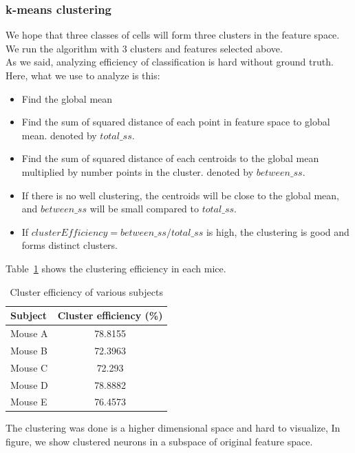 \documentclass[11pt]{article}
\begin{document}
\subsubsection{k-means clustering} %
\label{ssub:k_means_clustering}
We hope that three classes of cells will form three clusters in the feature space. We run the algorithm with 3 clusters and features selected above.\\
As we said,  analyzing efficiency of classification is hard without ground truth. Here, what we use to analyze is this:
\begin{itemize}
    \item Find the global mean
    \item Find the sum of squared distance of each point in feature space to global mean. denoted by $total\_ss$.
    \item Find the sum of squared distance of each centroids to the global mean multiplied by number points in the cluster. denoted by $between\_ss$.
    \item If there is no well clustering, the centroids will be close to the global mean, and $between\_ss$ will be small compared to $total\_ss$.
    \item If $clusterEfficiency = between\_ss/total\_ss$ is high, the clustering is good and forms distinct clusters.
\end{itemize}
Table~\ref{tab:cluster_efficiency} shows the clustering efficiency in each mice.
\begin{table}[ht]
    \centering
    \begin{tabular}{| l || c |}
        \hline
        Subject & Cluster efficiency (\%)\\
        \hline
        \hline
        Mouse A & 78.8155 \\
        \hline
        Mouse B & 72.3963 \\
        \hline
        Mouse C & 72.293 \\
        \hline
        Mouse D & 78.8882 \\
        \hline
        Mouse E & 76.4573 \\
        \hline
    \end{tabular}
    \caption{Cluster efficiency of various subjects}
    \label{tab:cluster_efficiency}
\end{table}
The clustering was done is a higher dimensional space and hard to visualize, In figure, we show clustered neurons in a subspace of original feature space.
\end{document}
